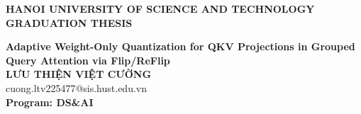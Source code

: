 \documentclass[main.tex]{subfiles}
\begin{document}
\begin{titlepage}
\thispagestyle{empty}

\begin{center}

{\textbf{\large{HANOI UNIVERSITY OF SCIENCE AND TECHNOLOGY}}}\\[4cm]

{\textbf{\huge{GRADUATION THESIS}}}\\[1cm]
{\textbf{\Large{Adaptive Weight-Only Quantization for QKV Projections in Grouped Query Attention via Flip/ReFlip}}\\[1cm]

{\textbf{\large{LƯU THIỆN VIỆT CƯỜNG}}}\\
{\large{cuong.ltv225477@sis.hust.edu.vn}}\\[0.5cm]

{\textbf{\large{Program: DS\&AI}}}\\

\vspace{4cm}

\begin{table}[H]
\centering
{}
\end{table}}
\end{center}

\end{titlepage}
\end{document}
